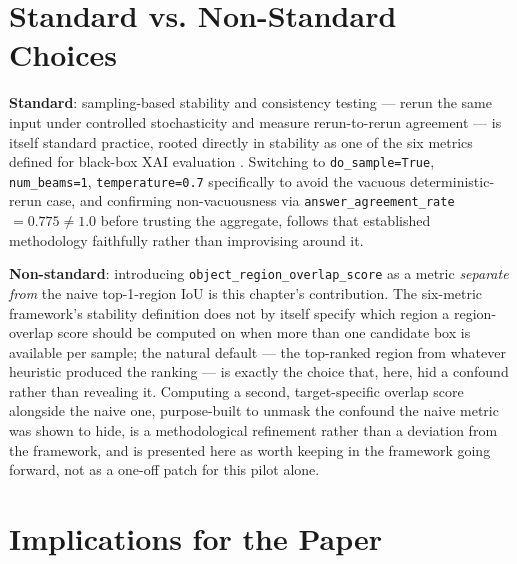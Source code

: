 \section{Standard vs. Non-Standard Choices}

\textbf{Standard}: sampling-based stability and consistency testing --- rerun the same input under
controlled stochasticity and measure rerun-to-rerun agreement --- is itself standard practice,
rooted directly in stability as one of the six metrics defined for black-box XAI evaluation
\citep{arreche2024exai}. Switching to \texttt{do\_sample=True}, \texttt{num\_beams=1},
\texttt{temperature=0.7} specifically to avoid the vacuous deterministic-rerun case, and confirming
non-vacuousness via \texttt{answer\_agreement\_rate}~$=0.775 \neq 1.0$ before trusting the
aggregate, follows that established methodology faithfully rather than improvising around it.

\textbf{Non-standard}: introducing \texttt{object\_region\_overlap\_score} as a metric
\emph{separate from} the naive top-1-region IoU is this chapter's contribution. The six-metric
framework's stability definition does not by itself specify which region a region-overlap score
should be computed on when more than one candidate box is available per sample; the natural default
--- the top-ranked region from whatever heuristic produced the ranking --- is exactly the choice
that, here, hid a confound rather than revealing it. Computing a second, target-specific overlap
score alongside the naive one, purpose-built to unmask the confound the naive metric was shown to
hide, is a methodological refinement rather than a deviation from the framework, and is presented
here as worth keeping in the framework going forward, not as a one-off patch for this pilot alone.

\section{Implications for the Paper}
\label{sec:day07-implications}

